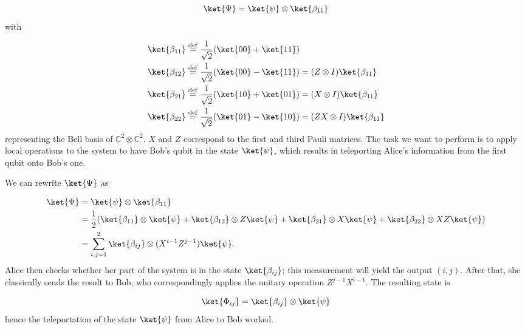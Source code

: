\documentclass[a4paper,11pt]{article}
\newcommand{\eqdef}{\overset{\mathrm{def}}{=}}
\begin{document}
\begin{equation}
    \ket{\Psi} = \ket{\psi} \otimes \ket{\beta_{11}}
\end{equation}
%
with

\begin{equation}
    \begin{split}
        &\ket{\beta_{11}} \eqdef \frac{1}{\sqrt{2}} (\ket{00} + \ket{11}) \\
        &\ket{\beta_{12}} \eqdef \frac{1}{\sqrt{2}} (\ket{00} - \ket{11}) = (Z \otimes I) \ket{\beta_{11}} \\
        &\ket{\beta_{21}} \eqdef \frac{1}{\sqrt{2}} (\ket{10} + \ket{01}) = (X \otimes I) \ket{\beta_{11}} \\
        &\ket{\beta_{22}} \eqdef \frac{1}{\sqrt{2}} (\ket{01} - \ket{10}) = (ZX \otimes I) \ket{\beta_{11}}
    \end{split}
\end{equation}
%
representing the Bell basis of $\mathbb{C}^2 \otimes \mathbb{C}^2$. $X$ and $Z$ correspond to the first and third Pauli matrices. The task we want to perform is to apply local operations to the system to have Bob's qubit in the state $\ket{\psi}$, which results in teleporting Alice's information from the first qubit onto Bob's one.

We can rewrite $\ket{\Psi}$ as

\begin{equation}
    \begin{split}
        \ket{\Psi} &= \ket{\psi} \otimes \ket{\beta_{11}} \\
        &= \frac{1}{2} (\ket{\beta_{11}} \otimes\ket{\psi} + \ket{\beta_{12}} \otimes Z \ket{\psi} + \ket{\beta_{21}} \otimes X \ket{\psi} + \ket{\beta_{22}} \otimes XZ \ket{\psi}) \\
        &= \sum_{i, j = 1}^2 \ket{\beta_{ij}} \otimes (X^{i-1}Z^{j-1})\ket{\psi} \text{.}
    \end{split}
    \label{initial state}
\end{equation}
%
Alice then checks whether her part of the system is in the state $\ket{\beta_{ij}}$; this measurement will yield the output $(i,j)$. After that, she classically sends the result to Bob, who correspondingly applies the unitary operation $Z^{j-1}X^{i-1}$. The resulting state is

\begin{equation}
    \ket{\Phi_{ij}} = \ket{\beta_{ij}} \otimes \ket{\psi}
\end{equation}
%
hence the teleportation of the state $\ket{\psi}$ from Alice to Bob worked.
\end{document}

